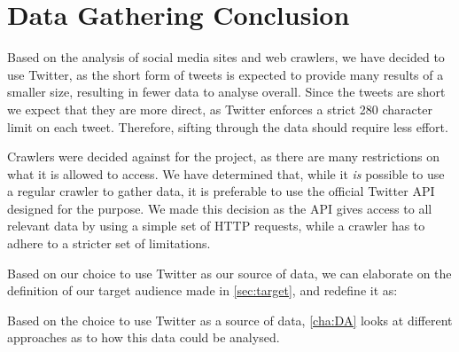 \section{Data Gathering Conclusion}\label{sec:social-media-conclusion}
Based on the analysis of social media sites and web crawlers, we have decided to
use Twitter, as the short form of tweets is expected to provide many results of
a smaller size, resulting in fewer data to analyse overall. Since the tweets
are short we expect that they are more direct, as Twitter enforces a
strict 280 character limit on each tweet. Therefore, sifting
through the data should require less effort.\nl

Crawlers were decided against for the project, as there are many restrictions on
what it is allowed to access. We have determined that, while it \textit{is}
possible to use a regular crawler to gather data, it is preferable to use the
official Twitter \ac{API} designed for the purpose. We made this decision as the
\ac{API} gives access to all relevant data by using a simple set of \ac{HTTP}
requests, while a crawler has to adhere to a stricter set of limitations.\nl

Based on our choice to use Twitter as our source of data, we can elaborate on
the definition of our target audience made in \autoref{sec:target}, and redefine it
as:  \nl

Based on the choice to use Twitter as a source of data, \autoref{cha:DA} looks
at different approaches as to how this data could be analysed.

